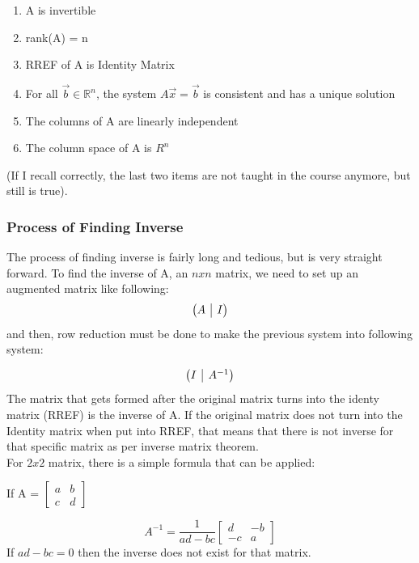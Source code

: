 \documentclass[12pt]{article}
\makeatletter
\newcommand{\R}{\mathbb{R}}
\newenvironment{amatrix}[1]{%
  \left(\begin{array}{@{}*{#1}{c}|c@{}}
}{%
  \end{array}\right)
}
\makeatother
\begin{document}
\begin{enumerate}
\item{A is invertible}
\item{rank(A) = n}
\item{RREF of A is Identity Matrix}
\item{For all $\vec{b} \in \R^n$, the system $A\vec{x}=\vec{b}$ is consistent and has a unique solution}
\item{The columns of A are linearly independent}
\item{The column space of A is $R^n$}
\end{enumerate}
(If I recall correctly, the last two items are not taught in the course anymore, but still is true).

\subsubsection{Process of Finding Inverse}
The process of finding inverse is fairly long and tedious, but is very straight forward. To find the inverse of A, an $nxn$ matrix, we need to set up an augmented matrix like following:\\
\begin{equation}
\begin{amatrix}{1}
   A & I \\
 \end{amatrix}
\end{equation}
and then, row reduction must be done to make the previous system into following system:

\begin{equation}
\begin{amatrix}{1}
   I & A^{-1} \\
 \end{amatrix}
\end{equation}
The matrix that gets formed after the original matrix turns into the identy matrix (RREF) is the inverse of A. If the original matrix does not turn into the Identity matrix when put into RREF, that means that there is not inverse for that specific matrix as per inverse matrix theorem.\\
For $2x2$ matrix, there is a simple formula that can be applied:\\
\begin{center}
If A = $\begin{bmatrix}a & b\\c & d\end{bmatrix}$
\end{center}
\begin{equation}
A^{-1} = \frac{1}{ad-bc}\begin{bmatrix}d & -b\\-c & a\end{bmatrix}
\end{equation}
If ${ad-bc} = 0$ then the inverse does not exist for that matrix.
\end{document}
